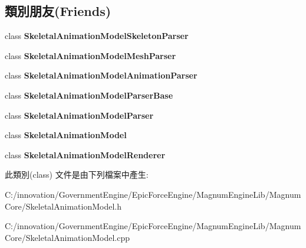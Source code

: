 \subsection*{類別朋友(Friends)}
\begin{DoxyCompactItemize}
\item 
class {\bfseries Skeletal\+Animation\+Model\+Skeleton\+Parser}\hypertarget{class_i_dream_sky_1_1_skeletal_animation_model_1_1_node_a14bd27cfabbcaeaa0eccce0e2968a6a1}{}\label{class_i_dream_sky_1_1_skeletal_animation_model_1_1_node_a14bd27cfabbcaeaa0eccce0e2968a6a1}

\item 
class {\bfseries Skeletal\+Animation\+Model\+Mesh\+Parser}\hypertarget{class_i_dream_sky_1_1_skeletal_animation_model_1_1_node_a85398ce1e5e5023cd13165515f7cfbfa}{}\label{class_i_dream_sky_1_1_skeletal_animation_model_1_1_node_a85398ce1e5e5023cd13165515f7cfbfa}

\item 
class {\bfseries Skeletal\+Animation\+Model\+Animation\+Parser}\hypertarget{class_i_dream_sky_1_1_skeletal_animation_model_1_1_node_ade6e25226df119aaa0de3f45d908a551}{}\label{class_i_dream_sky_1_1_skeletal_animation_model_1_1_node_ade6e25226df119aaa0de3f45d908a551}

\item 
class {\bfseries Skeletal\+Animation\+Model\+Parser\+Base}\hypertarget{class_i_dream_sky_1_1_skeletal_animation_model_1_1_node_a11930f7450c30641e8526b073100f760}{}\label{class_i_dream_sky_1_1_skeletal_animation_model_1_1_node_a11930f7450c30641e8526b073100f760}

\item 
class {\bfseries Skeletal\+Animation\+Model\+Parser}\hypertarget{class_i_dream_sky_1_1_skeletal_animation_model_1_1_node_a472cd974e223ab8bf1063fc39c8a7d43}{}\label{class_i_dream_sky_1_1_skeletal_animation_model_1_1_node_a472cd974e223ab8bf1063fc39c8a7d43}

\item 
class {\bfseries Skeletal\+Animation\+Model}\hypertarget{class_i_dream_sky_1_1_skeletal_animation_model_1_1_node_a40c4f607e5b71602c57777a29d5b4d31}{}\label{class_i_dream_sky_1_1_skeletal_animation_model_1_1_node_a40c4f607e5b71602c57777a29d5b4d31}

\item 
class {\bfseries Skeletal\+Animation\+Model\+Renderer}\hypertarget{class_i_dream_sky_1_1_skeletal_animation_model_1_1_node_a9a80d2b83f1f7bd922df78f21ee526db}{}\label{class_i_dream_sky_1_1_skeletal_animation_model_1_1_node_a9a80d2b83f1f7bd922df78f21ee526db}

\end{DoxyCompactItemize}


此類別(class) 文件是由下列檔案中產生\+:\begin{DoxyCompactItemize}
\item 
C\+:/innovation/\+Government\+Engine/\+Epic\+Force\+Engine/\+Magnum\+Engine\+Lib/\+Magnum\+Core/Skeletal\+Animation\+Model.\+h\item 
C\+:/innovation/\+Government\+Engine/\+Epic\+Force\+Engine/\+Magnum\+Engine\+Lib/\+Magnum\+Core/Skeletal\+Animation\+Model.\+cpp\end{DoxyCompactItemize}
